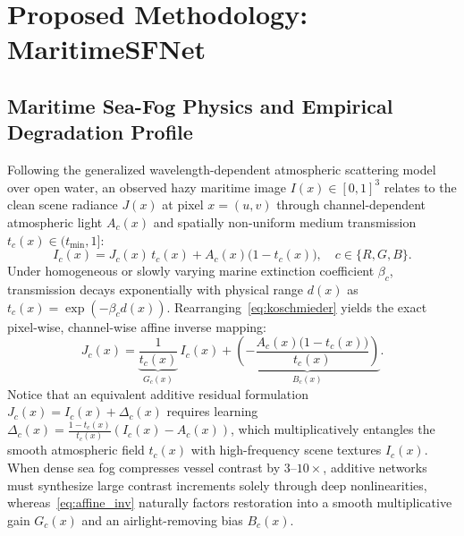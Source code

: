 \documentclass[journal,twoside]{IEEEtran}
\begin{document}
\section{Proposed Methodology: MaritimeSFNet}
\label{sec:method}

\subsection{Maritime Sea-Fog Physics and Empirical Degradation Profile}
\label{sec:physics}

Following the generalized wavelength-dependent atmospheric scattering model over open water, an observed hazy maritime image $I(x)\in[0,1]^3$ relates to the clean scene radiance $J(x)$ at pixel $x=(u,v)$ through channel-dependent atmospheric light $A_c(x)$ and spatially non-uniform medium transmission $t_c(x)\in(t_{\min},1]$:
\begin{equation}
I_c(x) = J_c(x)\,t_c(x) + A_c(x)\big(1 - t_c(x)\big), \quad c \in \{R,G,B\}.
\label{eq:koschmieder}
\end{equation}
Under homogeneous or slowly varying marine extinction coefficient $\beta_c$, transmission decays exponentially with physical range $d(x)$ as $t_c(x)=\exp(-\beta_c d(x))$. Rearranging~\eqref{eq:koschmieder} yields the exact pixel-wise, channel-wise affine inverse mapping:
\begin{equation}
J_c(x) = \underbrace{\frac{1}{t_c(x)}}_{G_c(x)}\,I_c(x) + \underbrace{\left(-\frac{A_c(x)\big(1 - t_c(x)\big)}{t_c(x)}\right)}_{B_c(x)}.
\label{eq:affine_inv}
\end{equation}
Notice that an equivalent additive residual formulation $J_c(x) = I_c(x) + \Delta_c(x)$ requires learning $\Delta_c(x) = \frac{1-t_c(x)}{t_c(x)}(I_c(x)-A_c(x))$, which multiplicatively entangles the smooth atmospheric field $t_c(x)$ with high-frequency scene textures $I_c(x)$. When dense sea fog compresses vessel contrast by $3\text{--}10\times$, additive networks must synthesize large contrast increments solely through deep nonlinearities, whereas~\eqref{eq:affine_inv} naturally factors restoration into a smooth multiplicative gain $G_c(x)$ and an airlight-removing bias $B_c(x)$.
\end{document}
